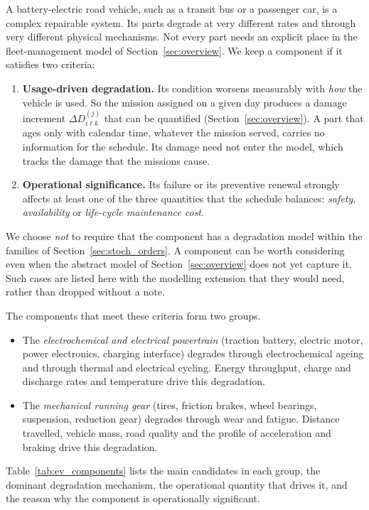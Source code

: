 \documentclass[11pt,a4paper]{article}
\theoremstyle{plain}
\theoremstyle{definition}
\theoremstyle{remark}
\begin{document}
A battery-electric road vehicle, such as a transit bus or a passenger car, is a complex repairable system.
Its parts degrade at very different rates and through very different physical mechanisms.
Not every part needs an explicit place in the fleet-management model of Section~\ref{sec:overview}.
We keep a component if it satisfies two criteria:
\begin{enumerate}[label=(C\arabic*)]
  \item \textbf{Usage-driven degradation.}
    Its condition worsens measurably with \emph{how} the vehicle is used.
    So the mission assigned on a given day produces a damage increment $\Delta D^{(j)}_{i\ell k}$ that can be quantified (Section~\ref{sec:overview}).
    A part that ages only with calendar time, whatever the mission served, carries no information for the schedule.
    Its damage need not enter the model, which tracks the damage that the missions cause.
  \item \textbf{Operational significance.}
    Its failure or its preventive renewal strongly affects at least one of the three quantities that the schedule balances: \emph{safety}, \emph{availability} or \emph{life-cycle maintenance cost}.
\end{enumerate}
We choose \emph{not} to require that the component has a degradation model within the families of Section~\ref{sec:stoch_orders}.
A component can be worth considering even when the abstract model of Section~\ref{sec:overview} does not yet capture it.
Such cases are listed here with the modelling extension that they would need, rather than dropped without a note.

The components that meet these criteria form two groups.
\begin{itemize}
  \item The \emph{electrochemical and electrical powertrain} (traction battery, electric motor, power electronics, charging interface) degrades through electrochemical ageing and through thermal and electrical cycling.
    Energy throughput, charge and discharge rates and temperature drive this degradation.
  \item The \emph{mechanical running gear} (tires, friction brakes, wheel bearings, suspension, reduction gear) degrades through wear and fatigue.
    Distance travelled, vehicle mass, road quality and the profile of acceleration and braking drive this degradation.
\end{itemize}
Table~\ref{tab:ev_components} lists the main candidates in each group, the dominant degradation mechanism, the operational quantity that drives it, and the reason why the component is operationally significant.
\end{document}
